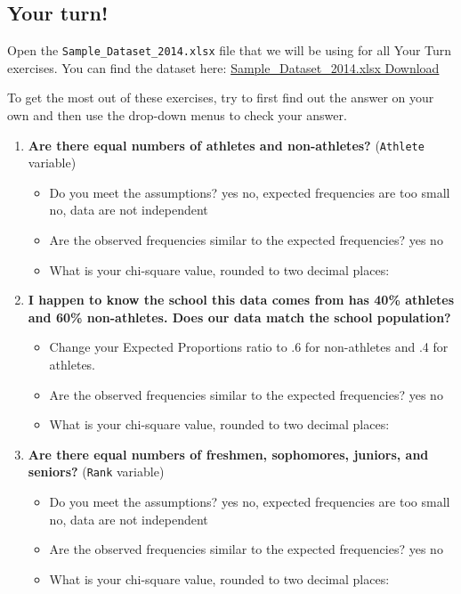 \documentclass[
]{book}
\begin{document}
\hypertarget{your-turn-3}{%
\subsection{Your turn!}\label{your-turn-3}}

Open the \texttt{Sample\_Dataset\_2014.xlsx} file that we will be using for all Your Turn exercises. You can find the dataset here: \href{https://github.com/danawanzer/stats-with-jamovi/blob/master/data/Sample_Dataset_2014.xlsx}{Sample\_Dataset\_2014.xlsx Download}

To get the most out of these exercises, try to first find out the answer on your own and then use the drop-down menus to check your answer.

\begin{enumerate}
\def\labelenumi{\arabic{enumi}.}
\item
  \textbf{Are there equal numbers of athletes and non-athletes?} (\texttt{Athlete} variable)

  \begin{itemize}
  \item
    Do you meet the assumptions? yes no, expected frequencies are too small no, data are not independent
  \item
    Are the observed frequencies similar to the expected frequencies? yes no
  \item
    What is your chi-square value, rounded to two decimal places:
  \end{itemize}
\item
  \textbf{I happen to know the school this data comes from has 40\% athletes and 60\% non-athletes. Does our data match the school population?}

  \begin{itemize}
  \item
    Change your Expected Proportions ratio to .6 for non-athletes and .4 for athletes.
  \item
    Are the observed frequencies similar to the expected frequencies? yes no
  \item
    What is your chi-square value, rounded to two decimal places:
  \end{itemize}
\item
  \textbf{Are there equal numbers of freshmen, sophomores, juniors, and seniors?} (\texttt{Rank} variable)

  \begin{itemize}
  \item
    Do you meet the assumptions? yes no, expected frequencies are too small no, data are not independent
  \item
    Are the observed frequencies similar to the expected frequencies? yes no
  \item
    What is your chi-square value, rounded to two decimal places:
  \end{itemize}
\end{enumerate}
\end{document}
